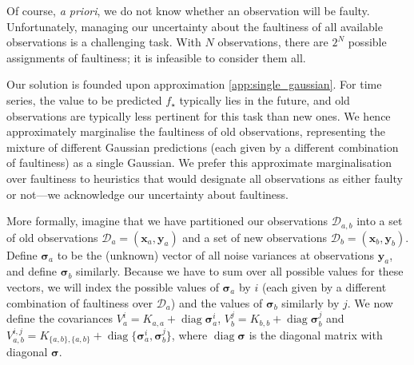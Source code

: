 \documentclass[twoside]{article}
\newcommand{\deq}{=}
\newcommand{\cm}[1]{\ensuremath{\mathcal{#1}}}
\newcommand{\bm}[1]{\ensuremath{\mathbf{#1}}}
\newcommand{\data}{\ensuremath{\cm{D}}}
\newcommand{\vect}[1]{\bm{#1}}
\newcommand{\vy}{\vect{y}}
\newcommand{\vx}{\vect{x}}
\newcommand{\vs}{\vect{\sigma}}
\newcommand{\st}{_{\star}}
\DeclareMathOperator{\diag}{diag}
\begin{document}
Of course, {\it a priori}, we do not know whether an
observation will be faulty.  Unfortunately, managing our uncertainty
about the faultiness of all available observations is a
challenging task. With $N$ observations, there are $2^N$
possible assignments of faultiness; it is infeasible to consider them all.

Our solution is founded upon approximation \ref{app:single_gaussian}. 
For time series, the value to be predicted $f\st$
typically lies in the future, and old observations are
typically less pertinent for this task than new ones. We hence approximately marginalise the faultiness of old observations, representing the mixture of different Gaussian predictions (each given by a different combination of faultiness) as a single Gaussian.
We prefer this approximate marginalisation over
faultiness to heuristics that would designate all
observations as either faulty or not---we acknowledge our
uncertainty about faultiness.

More formally, imagine that we have partitioned our observations
$\data_{a,b}$ into a set of old observations
$\data_a\deq(\vx_a,\vy_a)$ and a set of new observations $\data_b
\deq (\vx_b,\vy_b)$. Define $\vs_{a}$ to be the (unknown) vector of
all noise variances at observations $\vy_{a}$, and define $\vs_{b}$
similarly. Because we have to sum over all possible values for these
vectors, we will index the possible values of
$\vs_{a}$ by $i$ (each given by a different combination of
faultiness over $\data_a$) and the values of $\vs_{b}$ similarly by
$j$. We now define the covariances
 $V_a^i  \deq K_{a,a} + \diag \vs_{a}^i$,
 $V_b^j  \deq K_{b,b} + \diag \vs_{b}^j$ and
 $V_{a,b}^{i,j} \deq K_{\{a,b\},\{a,b\}} + \diag \{\vs_{a}^i,\vs_{b}^j\}$,
where $\diag \vs$ is the diagonal matrix with diagonal $\vs$. 
\end{document}
